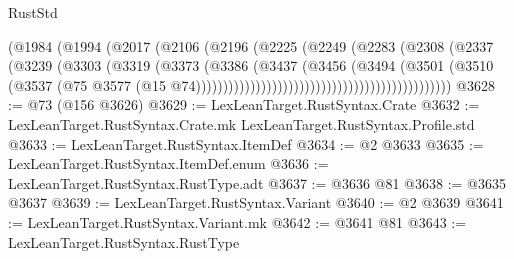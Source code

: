 \begin{lexlean}{RustStd}
\begin{coremodule}
                                                    (@1984
                                                      (@1994
                                                        (@2017
                                                          (@2106
                                                            (@2196
                                                              (@2225
                                                                (@2249
                                                                  (@2283
                                                                    (@2308
                                                                      (@2337
                                                                        (@3239
                                                                          (@3303
                                                                            (@3319
                                                                              (@3373
                                                                                (@3386
                                                                                  (@3437
                                                                                    (@3456
                                                                                      (@3494
                                                                                        (@3501
                                                                                          (@3510
                                                                                            (@3537
                                                                                              (@75
                                                                                                @3577
                                                                                                (@15
                                                                                                  @74)))))))))))))))))))))))))))))))))))))))))))))))
@3628 := @73 (@156 @3626)
@3629 := LexLeanTarget.RustSyntax.Crate
@3632 := LexLeanTarget.RustSyntax.Crate.mk LexLeanTarget.RustSyntax.Profile.std
@3633 := LexLeanTarget.RustSyntax.ItemDef
@3634 := @2 @3633
@3635 := LexLeanTarget.RustSyntax.ItemDef.enum
@3636 := LexLeanTarget.RustSyntax.RustType.adt
@3637 := @3636 @81
@3638 := @3635 @3637
@3639 := LexLeanTarget.RustSyntax.Variant
@3640 := @2 @3639
@3641 := LexLeanTarget.RustSyntax.Variant.mk
@3642 := @3641 @81
@3643 := LexLeanTarget.RustSyntax.RustType

\end{coremodule}
\end{lexlean}
